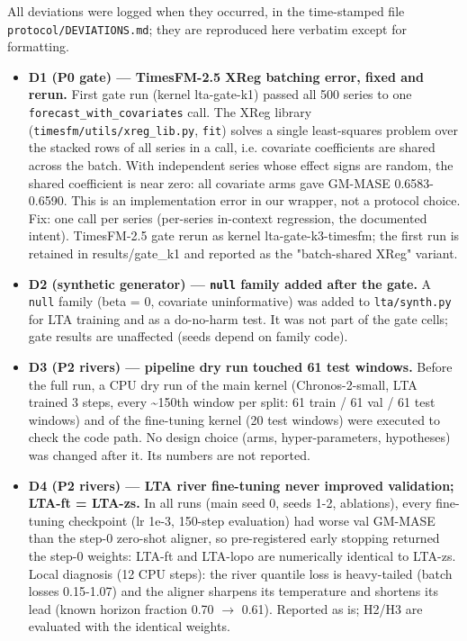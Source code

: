 All deviations were logged when they occurred, in the time-stamped file \texttt{protocol/DEVIATIONS.md}; they are reproduced here verbatim except for formatting.
\begin{itemize}
\item \textbf{D1 (P0 gate) — TimesFM-2.5 XReg batching error, fixed and rerun.} First gate run (kernel lta-gate-k1) passed all 500 series to one \texttt{forecast\_with\_covariates} call. The XReg library (\texttt{timesfm/utils/xreg\_lib.py}, \texttt{fit}) solves a single least-squares problem over the stacked rows of all series in a call, i.e. covariate coefficients are shared across the batch. With independent series whose effect signs are random, the shared coefficient is near zero: all covariate arms gave GM-MASE 0.6583-0.6590. This is an implementation error in our wrapper, not a protocol choice. Fix: one call per series (per-series in-context regression, the documented intent). TimesFM-2.5 gate rerun as kernel lta-gate-k3-timesfm; the first run is retained in results/gate\_k1 and reported as the "batch-shared XReg" variant.
\item \textbf{D2 (synthetic generator) — \texttt{null} family added after the gate.} A \texttt{null} family (beta = 0, covariate uninformative) was added to \texttt{lta/synth.py} for LTA training and as a do-no-harm test. It was not part of the gate cells; gate results are unaffected (seeds depend on family code).
\item \textbf{D3 (P2 rivers) — pipeline dry run touched 61 test windows.} Before the full run, a CPU dry run of the main kernel (Chronos-2-small, LTA trained 3 steps, every \textasciitilde{}150th window per split: 61 train / 61 val / 61 test windows) and of the fine-tuning kernel (20 test windows) were executed to check the code path. No design choice (arms, hyper-parameters, hypotheses) was changed after it. Its numbers are not reported.
\item \textbf{D4 (P2 rivers) — LTA river fine-tuning never improved validation; LTA-ft = LTA-zs.} In all runs (main seed 0, seeds 1-2, ablations), every fine-tuning checkpoint (lr 1e-3, 150-step evaluation) had worse val GM-MASE than the step-0 zero-shot aligner, so pre-registered early stopping returned the step-0 weights: LTA-ft and LTA-lopo are numerically identical to LTA-zs. Local diagnosis (12 CPU steps): the river quantile loss is heavy-tailed (batch losses 0.15-1.07) and the aligner sharpens its temperature and shortens its lead (known horizon fraction 0.70 $\rightarrow$ 0.61). Reported as is; H2/H3 are evaluated with the identical weights.

\end{itemize}
